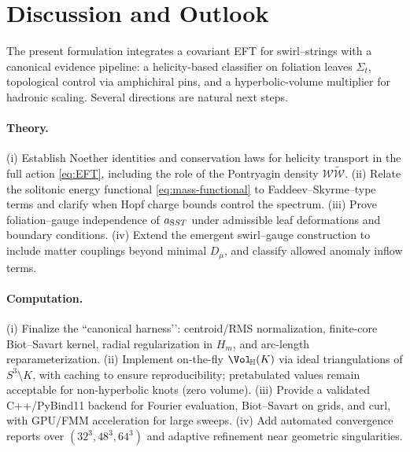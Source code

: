 \documentclass[11pt, preprint,titlepage]{revtex4-2}
\begin{document}
    \section{Discussion and Outlook}

    The present formulation integrates a covariant EFT for swirl–strings with a canonical evidence pipeline: a helicity-based classifier on foliation leaves \(\Sigma_t\), topological control via amphichiral pins, and a hyperbolic-volume multiplier for hadronic scaling. Several directions are natural next steps.

    \paragraph{Theory.}
    (i) Establish Noether identities and conservation laws for helicity transport in the full action \eqref{eq:EFT}, including the role of the Pontryagin density \(\mathcal{W}\tilde{\mathcal{W}}\).
    (ii) Relate the solitonic energy functional \eqref{eq:mass-functional} to Faddeev–Skyrme–type terms and clarify when Hopf charge bounds control the spectrum.
    (iii) Prove foliation–gauge independence of \(a_{\textrm SST}\) under admissible leaf deformations and boundary conditions.
    (iv) Extend the emergent swirl–gauge construction to include matter couplings beyond minimal \(D_\mu\), and classify allowed anomaly inflow terms.

    \paragraph{Computation.}
    (i) Finalize the “canonical harness’’: centroid/RMS normalization, finite-core Biot–Savart kernel, radial regularization in \(H_m\), and arc-length reparameterization.
    (ii) Implement on-the-fly \(\Vol_{\!\mathbb{H}}(K)\) via ideal triangulations of \(S^3\!\setminus\!K\), with caching to ensure reproducibility; pretabulated values remain acceptable for non-hyperbolic knots (zero volume).
    (iii) Provide a validated C++/PyBind11 backend for Fourier evaluation, Biot–Savart on grids, and curl, with GPU/FMM acceleration for large sweeps.
    (iv) Add automated convergence reports over \((32^3,48^3,64^3)\) and adaptive refinement near geometric singularities.
\end{document}
